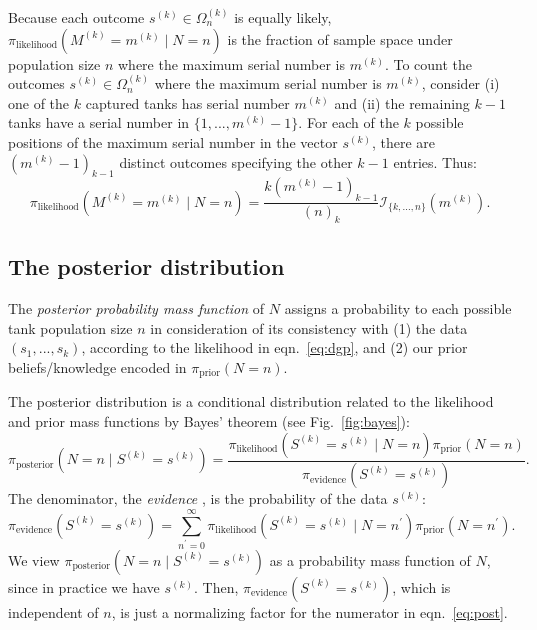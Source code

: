 \documentclass[11pt, oneside]{article}
\newcommand{\data}{$(s_1, ..., s_k)$\xspace}
\begin{document}
Because each outcome $s^{(k)}\in \Omega_n^{(k)}$ is equally likely, $\pi_{\text{likelihood}}(M^{(k)}=m^{(k)} \mid N=n)$ is the fraction of sample space under population size $n$ where the maximum serial number is $m^{(k)}$.
To count the outcomes $s^{(k)}\in\Omega_n^{(k)}$ where the maximum serial number is $m^{(k)}$, consider (i) one of the $k$ captured tanks has serial number $m^{(k)}$ and (ii) the remaining $k-1$ tanks have a serial number in $\{1, ..., m^{(k)}-1\}$.
For each of the $k$ possible positions of the maximum serial number in the vector $s^{(k)}$, there are $(m^{(k)}-1)_{k-1}$ distinct outcomes specifying the other $k-1$ entries.
Thus:
\begin{equation}
	\pi_{\text{likelihood}}(M^{(k)}=m^{(k)} \mid N=n)=
	\dfrac{k(m^{(k)}-1)_{k-1}}{(n)_k} \mathcal{I}_{\{k,...,n\}}(m^{(k)}). \label{eq:likelihood_m}
 \end{equation}
 

\subsection{The posterior distribution}
\label{sec:posterior}
The \emph{posterior probability mass function} of $N$ assigns a probability to each possible tank population size $n$ in consideration of its consistency with (1) the data \data, according to the likelihood in eqn.~\ref{eq:dgp}, and (2) our prior beliefs/knowledge encoded in $\pi_{\text{prior}}(N=n)$. 

The posterior distribution is a conditional distribution related to the likelihood and prior mass functions by Bayes' theorem \cite{kruschke2014doing} (see Fig.~\ref{fig:bayes}):
\begin{equation}
	\pi_{\text{posterior}}(N=n \mid S^{(k)}=s^{(k)}) = 
	\frac{\pi_{\text{likelihood}}(S^{(k)}=s^{(k)} \mid N=n) \pi_{\text{prior}}(N=n)}{\pi_{\text{evidence}}(S^{(k)}=s^{(k)})}. \label{eq:post}
\end{equation} 
The denominator, the \emph{evidence} \cite{kruschke2014doing}, is the probability of the data $s^{(k)}$:
\begin{equation}
	\pi_{\text{evidence}}(S^{(k)}=s^{(k)})= \displaystyle \sum_{n^\prime=0}^\infty \pi_{\text{likelihood}}(S^{(k)}=s^{(k)} \mid N=n^\prime) \pi_{\text{prior}}(N=n^\prime). \label{eq:prob_data}
\end{equation}
We view $\pi_{\text{posterior}}(N=n \mid S^{(k)}=s^{(k)})$ as a probability mass function of $N$, since in practice we have $s^{(k)}$. 
Then, $\pi_{\text{evidence}}(S^{(k)}=s^{(k)})$, which is independent of $n$, is just a normalizing factor for the numerator in eqn.~\ref{eq:post}. 
\end{document}
